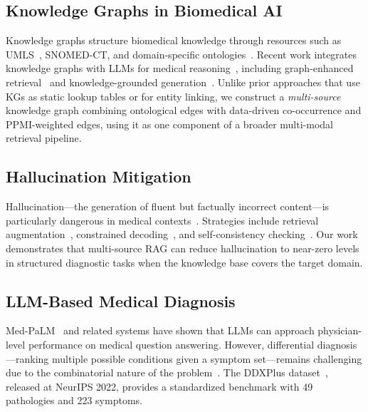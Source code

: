 \documentclass[preprint,12pt]{elsarticle}
\begin{document}
\subsection{Knowledge Graphs in Biomedical AI}

Knowledge graphs structure biomedical knowledge through resources such as UMLS~\cite{bodenreider2004unified}, SNOMED-CT, and domain-specific ontologies~\cite{santos2022knowledge,chandak2023building}. Recent work integrates knowledge graphs with LLMs for medical reasoning~\cite{pan2024unifying}, including graph-enhanced retrieval~\cite{he2024gretriever} and knowledge-grounded generation~\cite{yasunaga2022deep}. Unlike prior approaches that use KGs as static lookup tables or for entity linking, we construct a \emph{multi-source} knowledge graph combining ontological edges with data-driven co-occurrence and PPMI-weighted edges, using it as one component of a broader multi-modal retrieval pipeline.

\subsection{Hallucination Mitigation}

Hallucination---the generation of fluent but factually incorrect content---is particularly dangerous in medical contexts~\cite{ji2023survey,umapathi2023med}. Strategies include retrieval augmentation~\cite{shuster2021retrieval}, constrained decoding~\cite{lu2022neurologic}, and self-consistency checking~\cite{manakul2023selfcheckgpt}. Our work demonstrates that multi-source RAG can reduce hallucination to near-zero levels in structured diagnostic tasks when the knowledge base covers the target domain.

\subsection{LLM-Based Medical Diagnosis}

Med-PaLM~\cite{singhal2023large} and related systems have shown that LLMs can approach physician-level performance on medical question answering. However, differential diagnosis---ranking multiple possible conditions given a symptom set---remains challenging due to the combinatorial nature of the problem~\cite{mcduff2023towards}. The DDXPlus dataset~\cite{fansi2022ddxplus}, released at NeurIPS 2022, provides a standardized benchmark with 49 pathologies and 223 symptoms.

\end{document}
